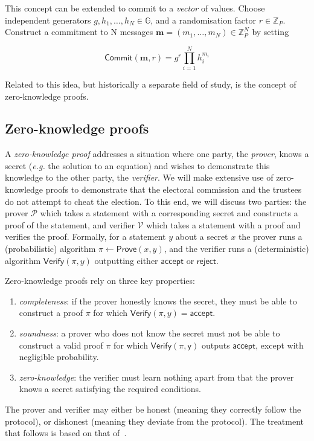 \documentclass[12pt,a4paper]{article}
\newcommand{\commit}{\mathsf{Commit}}
\theoremstyle{definition}
\newcommand{\eg}{\textit{e.g. }}
\begin{document}
This concept can be extended to commit to a \textit{vector} of values. Choose independent generators $g, h_1, \ldots, h_N\in\mathbb{G}$, and a randomisation factor $r\in\mathbb{Z}_P$. Construct a commitment to N messages $\mathbf{m}=(m_1,\ldots,m_N)\in\mathbb{Z}_P^N$ by setting

$$\commit(\mathbf{m}, r)=g^r\prod_{i=1}^N h_i^{m_i}$$

Related to this idea, but historically a separate field of study, is the concept of zero-knowledge proofs.

\subsection{Zero-knowledge proofs}
A \textit{zero-knowledge proof} addresses a situation where one party, the \textit{prover}, knows a secret (\eg the solution to an equation) and wishes to demonstrate this knowledge to the other party, the \textit{verifier}. We will make extensive use of zero-knowledge proofs to demonstrate that the electoral commission and the trustees do not attempt to cheat the election. To this end, we will discuss two parties: the prover $\mathcal{P}$ which takes a statement with a corresponding secret and constructs a proof of the statement, and verifier $\mathcal{V}$ which takes a statement with a proof and verifies the proof. Formally, for a statement $y$ about a secret $x$ the prover runs a (probabilistic) algorithm $\pi \gets \mathsf{Prove}(x, y)$, and the verifier runs a (deterministic) algorithm $\mathsf{Verify}(\pi, y)$ outputting either $\mathsf{accept}$ or $\mathsf{reject}$.

Zero-knowledge proofs rely on three key properties:
\begin{enumerate}
    \item \textit{completeness}: if the prover honestly knows the secret, they must be able to construct a proof $\pi$ for which $\mathsf{Verify}(\pi, y) = \mathsf{accept}$.
    \item \textit{soundness}: a prover who does not know the secret must not be able to construct a valid proof $\pi$ for which $\mathsf{Verify(\pi, y)}$ outputs $\mathsf{accept}$, except with negligible probability.
    \item \textit{zero-knowledge}: the verifier must learn nothing apart from that the prover knows a secret satisfying the required conditions.
\end{enumerate}
The prover and verifier may either be honest (meaning they correctly follow the protocol), or dishonest (meaning they deviate from the protocol). The treatment that follows is based on that of~\cite{boneh2020graduate}.
\end{document}
